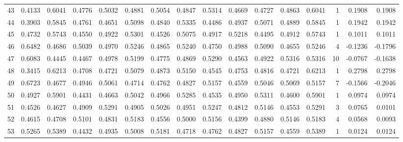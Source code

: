 \begin{tabular}{lrrrrrrrrrrrrrrr}
43  &      0.4133 &  0.6041 &  0.4776 &  0.5032 &  0.4881 &  0.5054 &  0.4847 &  0.5314 &  0.4669 &  0.4727 &   0.4863 &     0.6041 &      1 &                    0.1908 &                     0.1908 \\
44  &      0.3903 &  0.5845 &  0.4761 &  0.4651 &  0.5098 &  0.4840 &  0.5335 &  0.4486 &  0.4937 &  0.5071 &   0.4889 &     0.5845 &      1 &                    0.1942 &                     0.1942 \\
45  &      0.4732 &  0.5743 &  0.4550 &  0.4922 &  0.5301 &  0.4526 &  0.5075 &  0.4917 &  0.5218 &  0.4495 &   0.4912 &     0.5743 &      1 &                    0.1011 &                     0.1011 \\
46  &      0.6482 &  0.4686 &  0.5039 &  0.4970 &  0.5246 &  0.4865 &  0.5240 &  0.4750 &  0.4988 &  0.5090 &   0.4655 &     0.5246 &      4 &                   -0.1236 &                    -0.1796 \\
47  &      0.6083 &  0.4445 &  0.4467 &  0.4978 &  0.5199 &  0.4775 &  0.4869 &  0.5290 &  0.4563 &  0.4922 &   0.5316 &     0.5316 &     10 &                   -0.0767 &                    -0.1638 \\
48  &      0.3415 &  0.6213 &  0.4708 &  0.4721 &  0.5079 &  0.4873 &  0.5150 &  0.4545 &  0.4753 &  0.4816 &   0.4721 &     0.6213 &      1 &                    0.2798 &                     0.2798 \\
49  &      0.6723 &  0.4677 &  0.4946 &  0.5061 &  0.4714 &  0.4762 &  0.4827 &  0.5157 &  0.4559 &  0.5046 &   0.5069 &     0.5157 &      7 &                   -0.1566 &                    -0.2046 \\
50  &      0.4927 &  0.5901 &  0.4431 &  0.4663 &  0.5042 &  0.4966 &  0.5285 &  0.4535 &  0.4950 &  0.5311 &   0.4600 &     0.5901 &      1 &                    0.0974 &                     0.0974 \\
51  &      0.4526 &  0.4627 &  0.4909 &  0.5291 &  0.4905 &  0.5026 &  0.4951 &  0.5247 &  0.4812 &  0.5146 &   0.4553 &     0.5291 &      3 &                    0.0765 &                     0.0101 \\
52  &      0.4615 &  0.4708 &  0.5101 &  0.4831 &  0.5183 &  0.4556 &  0.5000 &  0.5156 &  0.4399 &  0.4880 &   0.5146 &     0.5183 &      4 &                    0.0568 &                     0.0093 \\
53  &      0.5265 &  0.5389 &  0.4432 &  0.4935 &  0.5008 &  0.5181 &  0.4718 &  0.4762 &  0.4827 &  0.5157 &   0.4559 &     0.5389 &      1 &                    0.0124 &                     0.0124 \\

\end{tabular}
